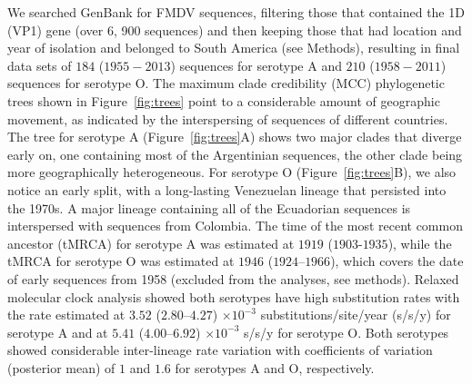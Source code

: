 \documentclass[10pt]{article}
\begin{document}
We searched GenBank for FMDV sequences, filtering those that contained the 1D (VP1) gene (over 6, 900 sequences) and then keeping those that had location and year of isolation and belonged to South America (see Methods), resulting in final data sets of $184$ ($1955-2013$) sequences for serotype A and $210$ ($1958-2011$) sequences for serotype O.
The maximum clade credibility (MCC) phylogenetic trees shown in Figure~\ref{fig:trees} point to a considerable amount of geographic movement, as indicated by the interspersing of sequences of different countries.
The tree for serotype A (Figure~\ref{fig:trees}A) shows two major clades that diverge early on, one containing most of the Argentinian sequences, the other clade being more geographically heterogeneous.
For serotype O (Figure~\ref{fig:trees}B), we also notice an early split, with a long-lasting Venezuelan lineage that persisted into the 1970s. 
A major lineage containing all of the Ecuadorian sequences is interspersed with sequences from Colombia.
The time of the most recent common ancestor (tMRCA) for serotype A was estimated at $1919$ ($1903$-$1935$), while the tMRCA for serotype O was estimated at $1946$ ($1924$--$1966$), which covers the date of early sequences from 1958 (excluded from the analyses, see methods).
Relaxed molecular clock analysis showed both serotypes have high substitution rates with the rate estimated at $3.52$ ($2.80$--$4.27$) $\times 10^{-3}$ substitutions/site/year (s/s/y) for serotype A  and at  $5.41$ ($4.00$--$6.92$) $\times 10^{-3}$ s/s/y for serotype O.
Both serotypes showed considerable inter-lineage rate variation with coefficients of variation (posterior mean) of $1$ and $1.6$ for serotypes A and O, respectively.
\end{document}
